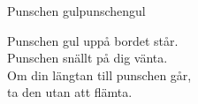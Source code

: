 \begin{song}{Punschen gul}{punschengul}
\begin{vers}
Punschen gul uppå bordet står.\\
Punschen snällt på dig vänta.\\
Om din längtan till punschen går,\\
ta den utan att flämta.\\
\end{vers}
\end{song}

